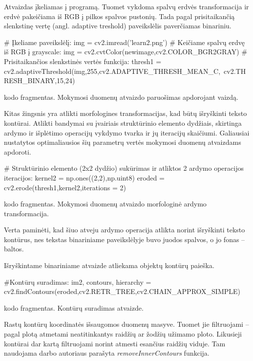 \documentclass[a4paper,12pt]{article}
\begin{document}
Atvaizdas įkeliamas į programą. Tuomet vykdoma spalvų erdvės transformacija ir erdvė pakeičiama iš RGB į pilkos spalvos pustonių. Tada pagal prisitaikančią slenkstinę vertę (angl. adaptive treshold) paveikslėlis paverčiamas binariniu.
	\begin{listing}[H]
\begin{pythoncode}
# Įkeliame paveikslėlį:
img = cv2.imread('learn2.png')
# Keičiame spalvų erdvę iš RGB į grayscale:
img = cv2.cvtColor(newimage,cv2.COLOR_BGR2GRAY)
# Prisitaikančios slenkstinės vertės funkcija:
thresh1 = cv2.adaptiveThreshold(img,255,cv2.ADAPTIVE_THRESH_MEAN_C,\
	cv2.THRESH_BINARY,15,24)
\end{pythoncode}
		\caption{kodo fragmentas. Mokymosi duomenų atvaizdo paruošimas apdorojant vaizdą.}		
	\end{listing}

Kitas žingsnis yra atlikti morfologines transformacijas, kad būtų išryškinti teksto kontūrai. Atlikti bandymai su įvairiais struktūrinio elemento dydžiais, skirtinga ardymo ir išplėtimo operacijų vykdymo tvarka ir jų iteracijų skaičiumi. Galiausiai nustatytos optimaliausios šių parametrų vertės mokymosi duomenų atvaizdams apdoroti.
	\begin{listing}[H]
\begin{pythoncode}
# Struktūrinio elemento (2x2 dydžio) sukūrimas ir atliktos 2 ardymo operacijos iteracijos: 
kernel2 = np.ones((2,2),np.uint8)		
eroded = cv2.erode(thresh1,kernel2,iterations = 2)
\end{pythoncode}
		\caption{kodo fragmentas. Mokymosi duomenų atvaizdo morfologinė ardymo transformacija.}		
	\end{listing}

Verta paminėti, kad šiuo atveju ardymo operacija atlikta norint išryškinti teksto kontūrus, nes tekstas binariniame paveikslėlyje buvo juodos spalvos, o jo fonas – baltos.

Išryškintame binariniame atvaizde atliekama objektų kontūrų paieška.
	\begin{listing}[H]
\begin{pythoncode}
#Kontūrų suradimas:
im2, contours, hierarchy = cv2.findContours(eroded,cv2.RETR_TREE,cv2.CHAIN_APPROX_SIMPLE)
\end{pythoncode}
	\caption{kodo fragmentas. Kontūrų suradimas atvaizde.}		
	\end{listing}
	
Rastų kontūrų koordinatės išsaugomos duomenų masyve. Tuomet jie filtruojami – pagal plotą atmetami neatitinkantys raidžių ar žodžių užimamo ploto. Likusieji kontūrai dar kartą filtruojami norint atmesti esančius raidžių viduje. Tam naudojama darbo autoriaus parašyta \textit{removeInnerContours} funkcija.
\end{document}
